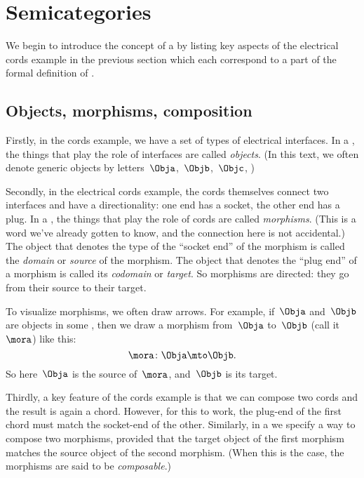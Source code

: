 
\section[Semicategories]{Semicategories}
\label{sec:formal-def-semicat}


We begin to introduce the concept of a  by listing key aspects of the electrical cords example in the previous section which each correspond to a part of the formal definition of .

\subsection{Objects, morphisms, composition}

Firstly, in the cords example, we have a set of types of electrical interfaces.
In a , the things that play the role of interfaces are called \emph{objects}.
(In this text, we often denote generic objects by letters~$\Obja$,~$\Objb$,~$\Objc$, \etc)

Secondly, in the electrical cords example, the cords themselves connect two interfaces and have a directionality: one end has a socket, the other end has a plug.
In a , the things that play the role of cords are called \emph{morphisms}.
(This is a word we've already gotten to know, and the connection here is not accidental.) The object that denotes the type of the ``socket end'' of the morphism is called the \emph{domain} or \emph{source} of the morphism.
The object that denotes the ``plug end'' of a morphism is called its \emph{codomain} or \emph{target}.
So morphisms are directed: they go from their source to their target.

To visualize morphisms, we often draw arrows.
For example, if~$\Obja$ and~$\Objb$ are objects in some , then we draw a morphism from~$\Obja$ to~$\Objb$ (call it~$\mora$) like this:
\begin{equation}
    \mora\colon \Obja \mto \Objb.
\end{equation}
So here~$\Obja$ is the source of~$\mora$, and~$\Objb$ is its target.

Thirdly, a key feature of the cords example is that we can compose two cords and the result is again a chord.
However, for this to work, the plug-end of the first chord must match the socket-end of the other.
Similarly, in a  we specify a way to compose two morphisms, provided that the target object of the first morphism matches the source object of the second morphism.
(When this is the case, the morphisms are said to be \emph{composable}.)

